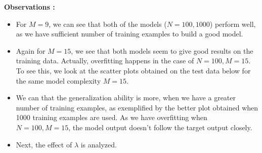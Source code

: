 \documentclass{article}
\begin{document}
\textbf{Observations : \newline}
\begin{itemize}
\item For $M=9$, we can see that both of the models ($N = 100 ,1000$) perform well, as we have sufficient number of training examples to build a good model.
\item Again for $M = 15$, we see that both models seem to give good results on the training data. Actually, overfitting happens in the case of $N= 100, M = 15$. To see this, we look at the scatter plots obtained on the test data below for the same model complexity $M = 15$.
\item We can that the generalization ability is more, when we have a greater number of training examples, as exemplified by the better plot obtained when 1000 training examples are used. As we have overfitting when $N = 100, M = 15$, the model output doesn't follow the target output closely. 

\item Next, the effect of $\lambda$ is analyzed.
\end{itemize}
\end{document}
